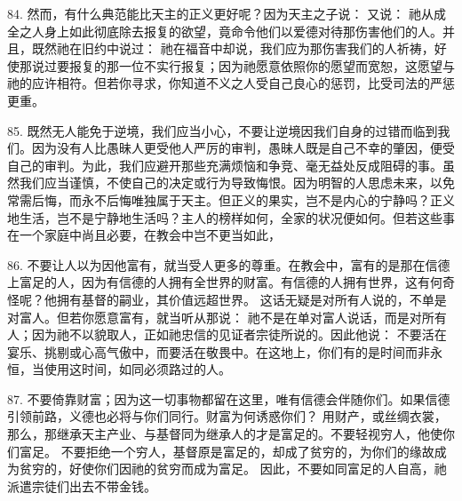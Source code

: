 84. 然而，有什么典范能比天主的正义更好呢？因为天主之子说：  又说：  祂从成全之人身上如此彻底除去报复的欲望，竟命令他们以爱德对待那伤害他们的人。并且，既然祂在旧约中说过：  祂在福音中却说，我们应为那伤害我们的人祈祷，好使那说过要报复的那一位不实行报复；因为祂愿意依照你的愿望而宽恕，这愿望与祂的应许相符。但若你寻求，你知道不义之人受自己良心的惩罚，比受司法的严惩更重。\par

85. 既然无人能免于逆境，我们应当小心，不要让逆境因我们自身的过错而临到我们。因为没有人比愚昧人更受他人严厉的审判，愚昧人既是自己不幸的肇因，便受自己的审判。为此，我们应避开那些充满烦恼和争竞、毫无益处反成阻碍的事。虽然我们应当谨慎，不使自己的决定或行为导致悔恨。因为明智的人思虑未来，以免常需后悔，而永不后悔唯独属于天主。但正义的果实，岂不是内心的宁静吗？正义地生活，岂不是宁静地生活吗？主人的榜样如何，全家的状况便如何。但若这些事在一个家庭中尚且必要，在教会中岂不更当如此， \par

86. 不要让人以为因他富有，就当受人更多的尊重。在教会中，富有的是那在信德上富足的人，因为有信德的人拥有全世界的财富。有信德的人拥有世界，这有何奇怪呢？他拥有基督的嗣业，其价值远超世界。  这话无疑是对所有人说的，不单是对富人。但若你愿意富有，就当听从那说：  祂不是在单对富人说话，而是对所有人；因为祂不以貌取人，正如祂忠信的见证者宗徒所说的。因此他说：  不要活在宴乐、挑剔或心高气傲中，而要活在敬畏中。在这地上，你们有的是时间而非永恒，当使用这时间，如同必须路过的人。\par

87. 不要倚靠财富；因为这一切事物都留在这里，唯有信德会伴随你们。如果信德引领前路，义德也必将与你们同行。财富为何诱惑你们？ 用财产，或丝绸衣裳，  那么，那继承天主产业、与基督同为继承人的才是富足的。不要轻视穷人，他使你们富足。 不要拒绝一个穷人，基督原是富足的，却成了贫穷的，为你们的缘故成为贫穷的，好使你们因祂的贫穷而成为富足。 因此，不要如同富足的人自高，祂派遣宗徒们出去不带金钱。\par

